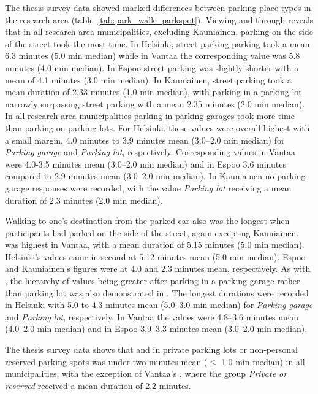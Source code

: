 The thesis survey data showed marked differences between parking place types in the research area (table~\ref{tab:park_walk_parkspot}). Viewing  and  through  reveals that in all research area municipalities, excluding Kauniainen, parking on the side of the street took the most time. In Helsinki, street parking parking took a mean 6.3 minutes (5.0 min median) while in Vantaa the corresponding value was 5.8 minutes (4.0 min median). In Espoo street parking was slightly shorter with a mean of 4.1 minutes (3.0 min median). In Kauniainen, street parking took a mean duration of 2.33 minutes (1.0 min median), with parking in a parking lot narrowly surpassing street parking with a mean 2.35 minutes (2.0 min median). In all research area municipalities parking in parking garages took more time than parking on parking lots. For Helsinki, these values were overall highest with a small margin, 4.0 minutes to 3.9 minutes mean (3.0--2.0 min median) for \textit{Parking garage} and \textit{Parking lot}, respectively. Corresponding values in Vantaa were 4.0-3.5 minutes mean (3.0--2.0 min median) and in Espoo 3.6 minutes compared to 2.9 minutes mean (3.0--2.0 min median). In Kauniainen no parking garage responses were recorded, with the value \textit{Parking lot} receiving a mean duration of 2.3 minutes (2.0 min median).

Walking to one's destination from the parked car also was the longest when participants had parked on the side of the street, again excepting Kauniainen.  was highest in Vantaa, with a mean duration of 5.15 minutes (5.0 min median). Helsinki's values came in second at 5.12 minutes mean (5.0 min median). Espoo and Kauniainen's figures were at 4.0 and 2.3 minutes mean, respectively. As with , the hierarchy of values being greater after parking in a parking garage rather than parking lot was also demonstrated in . The longest durations were recorded in Helsinki with 5.0 to 4.3 minutes mean (5.0--3.0 min median) for \textit{Parking garage} and \textit{Parking lot}, respectively. In Vantaa the values were 4.8--3.6 minutes mean (4.0--2.0 min median) and in Espoo 3.9--3.3 minutes mean (3.0--2.0 min median). 

The thesis survey data shows that  and  in private parking lots or non-personal reserved parking spots was under two minutes mean ($\leq$ 1.0 min median) in all municipalities, with the exception of Vantaa's , where the group \textit{Private or reserved} received a mean duration of 2.2 minutes.

